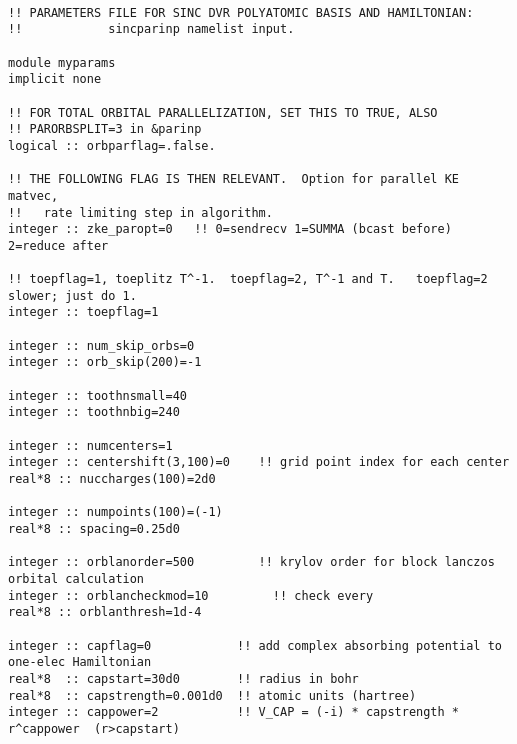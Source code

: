 \begin{verbatim}

!! PARAMETERS FILE FOR SINC DVR POLYATOMIC BASIS AND HAMILTONIAN:
!!            sincparinp namelist input.

module myparams
implicit none

!! FOR TOTAL ORBITAL PARALLELIZATION, SET THIS TO TRUE, ALSO
!! PARORBSPLIT=3 in &parinp
logical :: orbparflag=.false.

!! THE FOLLOWING FLAG IS THEN RELEVANT.  Option for parallel KE matvec,
!!   rate limiting step in algorithm.
integer :: zke_paropt=0   !! 0=sendrecv 1=SUMMA (bcast before) 2=reduce after

!! toepflag=1, toeplitz T^-1.  toepflag=2, T^-1 and T.   toepflag=2 slower; just do 1.
integer :: toepflag=1

integer :: num_skip_orbs=0
integer :: orb_skip(200)=-1

integer :: toothnsmall=40
integer :: toothnbig=240

integer :: numcenters=1
integer :: centershift(3,100)=0    !! grid point index for each center
real*8 :: nuccharges(100)=2d0

integer :: numpoints(100)=(-1)
real*8 :: spacing=0.25d0

integer :: orblanorder=500         !! krylov order for block lanczos orbital calculation
integer :: orblancheckmod=10         !! check every
real*8 :: orblanthresh=1d-4

integer :: capflag=0            !! add complex absorbing potential to one-elec Hamiltonian
real*8  :: capstart=30d0        !! radius in bohr
real*8  :: capstrength=0.001d0  !! atomic units (hartree)
integer :: cappower=2           !! V_CAP = (-i) * capstrength * r^cappower  (r>capstart)

\end{verbatim}
